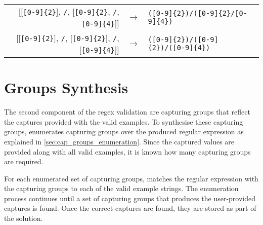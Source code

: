 \begin{example}
\begin{center}
\begin{tabular}{rcl}
[[\verb![0-9]{2}!], \verb!/!, [\verb![0-9]{2}!, \verb!/!, \verb![0-9]{4}!]] & $\rightarrow$ & \verb!([0-9]{2})/([0-9]{2}/[0-9]{4})! \\

[[\verb![0-9]{2}!], \verb!/!, [\verb![0-9]{2}!], \verb!/!, [\verb![0-9]{4}!]] & $\rightarrow$ & \verb!([0-9]{2})/([0-9]{2})/([0-9]{4})!
\end{tabular}\bigskip
\end{center}
\end{example}

\section{Groups Synthesis}\label{sec:cap_groups_synthesis}
The second component of the regex validation are capturing groups that reflect the captures provided with the valid examples. To synthesise these capturing groups, \Forest enumerates capturing groups over the produced regular expression as explained in \autoref{sec:cap_groups_enumeration}. Since the captured values are provided along with all valid examples, it is known how many capturing groups are required.

For each enumerated set of capturing groups, \Forest matches the regular expression with the capturing groups to each of the valid example strings. The enumeration process continues until a set of capturing groups that produces the user-provided captures is found. Once the correct captures are found, they are stored as part of the solution.

